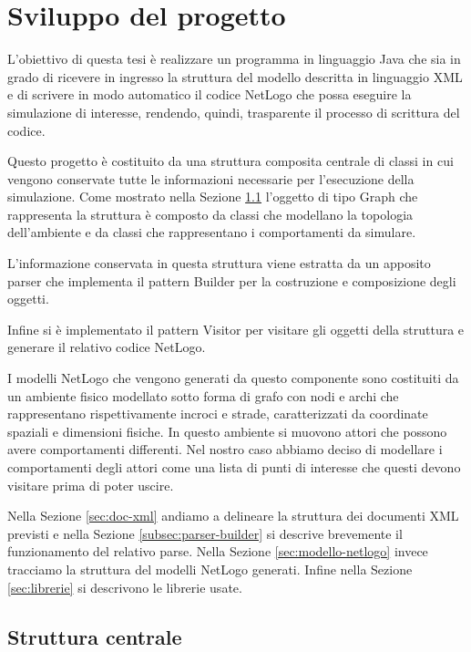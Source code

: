\chapter{Sviluppo del progetto}
\label{cap:sviluppo-progetto}

L'obiettivo di questa tesi è realizzare un programma in linguaggio Java che sia in grado di ricevere in ingresso la struttura del modello descritta in linguaggio XML e di scrivere in modo automatico il codice NetLogo che possa eseguire la simulazione di interesse, rendendo, quindi, trasparente il processo di scrittura del codice.

Questo progetto è costituito da una struttura composita centrale di classi in cui vengono conservate tutte le informazioni necessarie per l'esecuzione della simulazione. Come mostrato nella Sezione \ref{sec:strttura-interna} l'oggetto di tipo Graph che rappresenta la struttura è composto da classi che modellano la topologia dell'ambiente e da classi che rappresentano i comportamenti da simulare.

L'informazione conservata in questa struttura viene estratta da un apposito parser che implementa il pattern Builder per la costruzione e composizione degli oggetti.

Infine si è implementato il pattern Visitor per visitare gli oggetti della struttura e generare il relativo codice NetLogo.

I modelli NetLogo che vengono generati da questo componente sono costituiti da un ambiente fisico modellato sotto forma di grafo con nodi e archi che rappresentano rispettivamente incroci e strade, caratterizzati da coordinate spaziali e dimensioni fisiche. In questo ambiente si muovono attori che possono avere comportamenti differenti. Nel nostro caso abbiamo deciso di modellare i comportamenti degli attori come una lista di punti di interesse che questi devono visitare prima di poter uscire.

Nella Sezione \ref{sec:doc-xml} andiamo a delineare la struttura dei documenti XML previsti e nella Sezione \ref{subsec:parser-builder} si descrive brevemente il funzionamento del relativo parse. Nella Sezione \ref{sec:modello-netlogo} invece tracciamo la struttura del modelli NetLogo generati. Infine nella Sezione \ref{sec:librerie} si descrivono le librerie usate.

\section{Struttura centrale}
\label{sec:strttura-interna}

